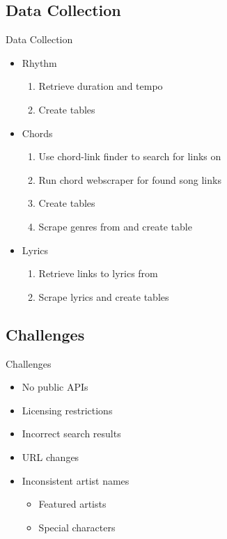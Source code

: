 \subsection{Data Collection}
\begin{frame}{Data Collection}
    \begin{itemize}
        \item Rhythm
        \begin{enumerate}
            \item Retrieve duration \autocite{spot} and tempo \autocite{sbpm}
            \item Create tables
        \end{enumerate}
        \item Chords
        \begin{enumerate}
            \item Use chord-link finder to search for links on \textcite{ug}
            \item Run chord webscraper for found song links
            \item Create tables
            \item Scrape genres from \textcite{lastfm} and create table
        \end{enumerate}
        \item Lyrics
        \begin{enumerate}
            \item Retrieve links to lyrics from \textcite{lyr}
            \item Scrape lyrics and create tables
        \end{enumerate}
    \end{itemize}
\end{frame}
\subsection{Challenges}
\begin{frame}{Challenges}
    \begin{itemize}
        \item No public APIs
        \item Licensing restrictions
        \item Incorrect search results
        \item URL changes
        \item Inconsistent artist names
            \begin{itemize} 
                \item Featured artists
                \item Special characters
            \end{itemize}
    \end{itemize}
\end{frame}

